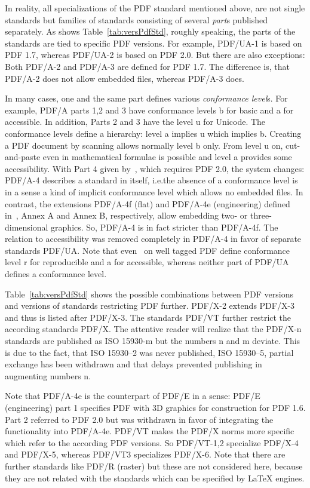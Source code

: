 In reality, all specializations of the PDF standard mentioned above, are not single standards 
but families of standards consisting of several \emph{part}s published separately. 
As shows Table~\ref{tab:versPdfStd}, roughly speaking, 
the parts of the standards are tied to specific PDF versions. 
For example, PDF/UA-1 is based on PDF 1.7, whereas PDF/UA-2 is based on PDF 2.0. 
But there are also exceptions: Both PDF/A-2 and PDF/A-3 are defined for PDF 1.7. 
The difference is, that PDF/A-2 does not allow embedded files, whereas PDF/A-3 does. 

In many cases, one and the same part defines various \emph{conformance level}s. 
For example, PDF/A parts 1,2 and 3 have conformance levels b for basic and a for accessible. 
In addition, Parts 2 and 3 have the level u for Unicode. 
The conformance levels define a hierarchy: level a implies u which implies b. 
Creating a PDF document by scanning allows normally level b only. 
From level u on, cut-and-paste even in mathematical formulae is possible 
and level a provides some accessibility. 
With Part 4 given by~\cite{PdfA4}, which requires PDF 2.0, the system changes: 
PDF/A-4 describes a standard in itself, 
i.e.\@ the absence of a conformance level is in a sense a kind of implicit conformance level 
which allows no embedded files. 
In contrast, the extensions PDF/A-4f (flat) and PDF/A-4e (engineering) 
defined in~\cite{PdfA4}, Annex A and Annex B, respectively, 
allow embedding two- or three-dimensional graphics. 
So, PDF/A-4 is in fact stricter than PDF/A-4f. 
The relation to accessibility was removed completely in PDF/A-4 
in favor of separate standards PDF/UA\@. 
Note that even~\cite{WtPDF1} on well tagged PDF define conformance level r for reproducible 
and a for accessible, whereas neither part of PDF/UA defines a conformance level. 

Table~\ref{tab:versPdfStd} shows the possible combinations between PDF versions 
and versions of standards restricting PDF further. 
PDF/X-2 extends PDF/X-3 and thus is listed after PDF/X-3. 
The standards PDF/VT further restrict the according standards PDF/X. 
The attentive reader will realize that the PDF/X-n standards are published as ISO 15930-m 
but the numbers n and m deviate. 
This is due to the fact, that ISO 15930--2 was never published, ISO 15930--5, partial exchange has been withdrawn 
and that delays prevented publishing in augmenting numbers n. 

Note that PDF/A-4e is the counterpart of PDF/E in a sense: 
PDF/E (engineering) part 1 specifies PDF with 3D graphics for construction for PDF 1.6. 
Part 2 referred to PDF 2.0 but was withdrawn in favor of integrating the functionality into PDF/A-4e. 
PDF/VT makes the PDF/X norms more specific which refer to the according PDF versions. 
So PDF/VT-1,2 specialize PDF/X-4 and PDF/X-5, whereas PDF/VT3 specializes PDF/X-6. 
Note that there are further standards like PDF/R (raster) but these are not considered here, 
because they are not related with the standards which can be specified by \LaTeX{} engines. 

